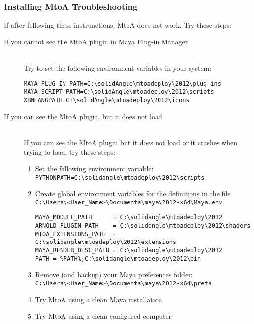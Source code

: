 \subsubsection{Installing MtoA Troubleshooting}
If after following these instrunctions, MtoA does not work. Try these steps:

\begin{description}

\item[If you cannot see the MtoA plugin in Maya Plug-in Manager] \hfill \\
Try to set the following environment variables in your system:
{\footnotesize \begin{verbatim}
MAYA_PLUG_IN_PATH=C:\solidAngle\mtoadeploy\2012\plug-ins
MAYA_SCRIPT_PATH=C:\solidAngle\mtoadeploy\2012\scripts
XBMLANGPATH=C:\solidAngle\mtoadeploy\2012\icons
\end{verbatim}}

\item[If you can see the MtoA plugin, but it does not load] \hfill \\
If you can see the MtoA plugin but it does not load or it crashes when trying to load, try these steps:
\begin{enumerate}
\item Set the following environment variable:\\
\verb|PYTHONPATH=C:\solidangle\mtoadeploy\2012\scripts|

\item Create global environment variables for the definitions in the file\\
\verb|C:\Users\<User_Name>\Documents\maya\2012-x64\Maya.env|\\

{\footnotesize \begin{verbatim}
MAYA_MODULE_PATH      = C:\solidangle\mtoadeploy\2012
ARNOLD_PLUGIN_PATH    = C:\solidangle\mtoadeploy\2012\shaders
MTOA_EXTENSIONS_PATH  = C:\solidangle\mtoadeploy\2012\extensions
MAYA_RENDER_DESC_PATH = C:\solidangle\mtoadeploy\2012
PATH = %PATH%;C:\solidangle\mtoadeploy\2012\bin
\end{verbatim}}

\item Remove (and backup) your Maya preferences folder:\\
\verb|C:\Users\<User_Name>\Documents\maya\2012-x64\prefs|

\item Try MtoA using a clean Maya installation

\item Try MtoA using a clean configured computer

\end{enumerate}

\end{description}

